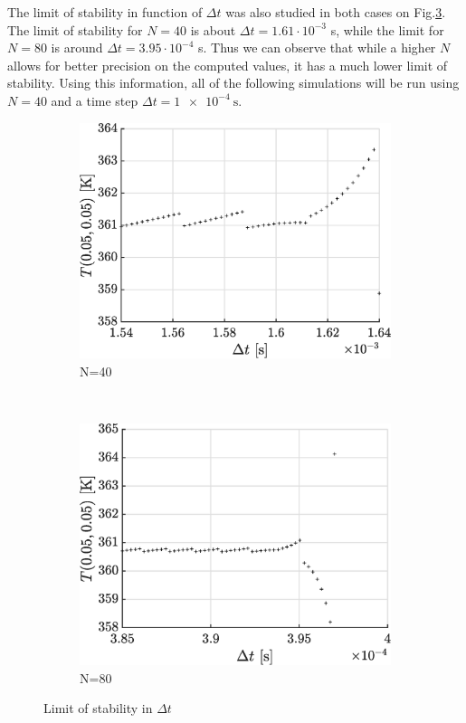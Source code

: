 \documentclass[a4paper,12pt,twoside]{article}
\begin{document}
The limit of stability in function of $\Delta t$ was also studied in both cases on Fig.\ref{fig:blim}. The limit of stability for $N=40$ is about $\Delta t = 1.61 \cdot 10^{-3}$ s, while the limit for $N=80$ is around $\Delta t = 3.95 \cdot 10^{-4}$ s. Thus we can observe that while a higher $N$ allows for better precision on the computed values, it has a much lower limit of stability. Using this information, all of the following simulations will be run using $N=40$ and a time step $\Delta t = \SI{1e-4}{\s}$.

\begin{figure}[h]
  \centering
  \begin{subfigure}[t]{0.45\textwidth}
    \includegraphics[width=\textwidth]{graphs/b_lim40.eps}

    \caption{N=40}
    \label{fig:b-lim40}
  \end{subfigure}
  ~
  \begin{subfigure}[t]{0.45\textwidth}
    \includegraphics[width=\textwidth]{graphs/b_lim80.eps}
    \caption{N=80}
    \label{fig:b-lim80}
  \end{subfigure}
  \caption{Limit of stability in $\Delta t$}
  \label{fig:blim}
\end{figure}
\end{document}
